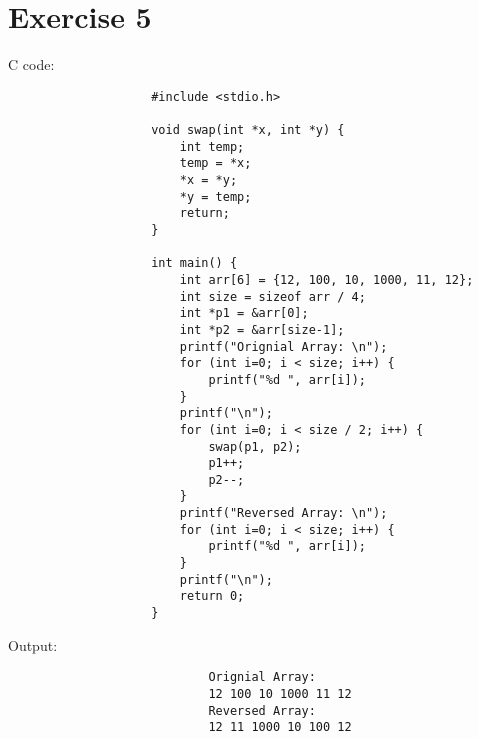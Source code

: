 \documentclass[12pt]{article}
\begin{document}
    \section*{Exercise 5}
    \noindent C code:
    \begin{verbatim}
                    #include <stdio.h>

                    void swap(int *x, int *y) {
                        int temp;
                        temp = *x;
                        *x = *y;
                        *y = temp;
                        return;
                    }

                    int main() {
                        int arr[6] = {12, 100, 10, 1000, 11, 12};
                        int size = sizeof arr / 4;
                        int *p1 = &arr[0];
                        int *p2 = &arr[size-1];
                        printf("Orignial Array: \n");
                        for (int i=0; i < size; i++) {
                            printf("%d ", arr[i]);
                        }
                        printf("\n");
                        for (int i=0; i < size / 2; i++) {
                            swap(p1, p2);
                            p1++;
                            p2--;
                        }
                        printf("Reversed Array: \n");
                        for (int i=0; i < size; i++) {
                            printf("%d ", arr[i]);
                        }
                        printf("\n");
                        return 0;
                    }
    \end{verbatim}
    Output:
    \begin{verbatim}
                            Orignial Array:
                            12 100 10 1000 11 12
                            Reversed Array:
                            12 11 1000 10 100 12
    \end{verbatim}
\end{document}

